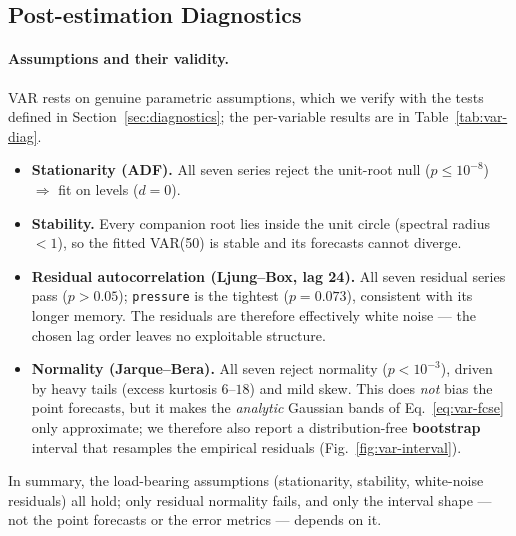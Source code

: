 \documentclass[12pt,a4paper,oneside]{report}
\begin{document}
\subsection{Post-estimation Diagnostics}
\label{sec:var-diag}
\paragraph{Assumptions and their validity.}
VAR rests on genuine parametric assumptions, which we verify with the tests defined
in Section~\ref{sec:diagnostics}; the per-variable results are in
Table~\ref{tab:var-diag}.
\begin{itemize}
  \item \textbf{Stationarity (ADF).} All seven series reject the unit-root null
        ($p \le 10^{-8}$) $\Rightarrow$ fit on levels ($d=0$).
  \item \textbf{Stability.} Every companion root lies inside the unit circle
        (spectral radius $<1$), so the fitted VAR(50) is stable and its forecasts
        cannot diverge.
  \item \textbf{Residual autocorrelation (Ljung--Box, lag 24).} All seven residual
        series pass ($p>0.05$); \texttt{pressure} is the tightest ($p=0.073$),
        consistent with its longer memory. The residuals are therefore effectively
        white noise --- the chosen lag order leaves no exploitable structure.
  \item \textbf{Normality (Jarque--Bera).} All seven reject normality
        ($p<10^{-3}$), driven by heavy tails (excess kurtosis $6$--$18$) and mild
        skew. This does \emph{not} bias the point forecasts, but it makes the
        \emph{analytic} Gaussian bands of Eq.~\eqref{eq:var-fcse} only approximate;
        we therefore also report a distribution-free \textbf{bootstrap} interval
        that resamples the empirical residuals (Fig.~\ref{fig:var-interval}).
\end{itemize}
In summary, the load-bearing assumptions (stationarity, stability, white-noise
residuals) all hold; only residual normality fails, and only the interval shape ---
not the point forecasts or the error metrics --- depends on it.
\end{document}
